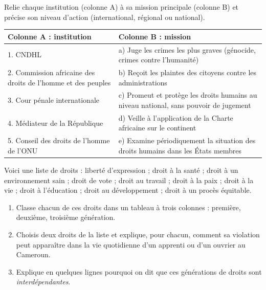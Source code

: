 \documentclass[11pt]{article}
\newcounter{popsec}
\newcounter{popsub}
\newcommand{\courssub}[1]{%
  \stepcounter{popsub}%
  \par\vspace{9pt}\noindent{\popxbold\fontsize{11.5}{13}\selectfont\color{popink}{\color{poporange}\thepopsec.\thepopsub}\hspace{6pt}#1}\par\nopagebreak\vspace{4pt}
}
\begin{document}
\begin{exercice}
Relie chaque institution (colonne A) à sa mission principale (colonne B) et précise son niveau d'action (international, régional ou national).

\begin{center}
\begin{tabularx}{\linewidth}{|l|X|}
\hline
\rowcolor{popblueL} \textbf{Colonne A : institution} & \textbf{Colonne B : mission} \\
\hline
1. CNDHL & a) Juge les crimes les plus graves (génocide, crimes contre l'humanité) \\
\hline
2. Commission africaine des droits de l'homme et des peuples & b) Reçoit les plaintes des citoyens contre les administrations \\
\hline
3. Cour pénale internationale & c) Promeut et protège les droits humains au niveau national, sans pouvoir de jugement \\
\hline
4. Médiateur de la République & d) Veille à l'application de la Charte africaine sur le continent \\
\hline
5. Conseil des droits de l'homme de l'ONU & e) Examine périodiquement la situation des droits humains dans les États membres \\
\hline
\end{tabularx}
\end{center}
\end{exercice}

\courssub{Je m'entraîne}

\begin{exercice}
Voici une liste de droits : liberté d'expression ; droit à la santé ; droit à un environnement sain ; droit de vote ; droit au travail ; droit à la paix ; droit à la vie ; droit à l'éducation ; droit au développement ; droit à un procès équitable.

\begin{enumerate}
\item Classe chacun de ces droits dans un tableau à trois colonnes : première, deuxième, troisième génération.
\item Choisis deux droits de la liste et explique, pour chacun, comment sa violation peut apparaître dans la vie quotidienne d'un apprenti ou d'un ouvrier au Cameroun.
\item Explique en quelques lignes pourquoi on dit que ces générations de droits sont \emph{interdépendantes}.
\end{enumerate}
\end{exercice}
\end{document}

